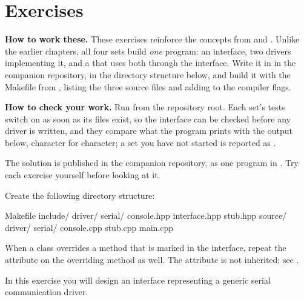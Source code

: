 
\section{Exercises}
\label{c3:sec:exercises}\label{c3:app:c}

\begin{aside}
\textbf{How to work these.} These exercises reinforce the concepts from
 and . Unlike the earlier chapters, all four
sets build \emph{one} program: an interface, two drivers implementing it, and a  that
uses both through the interface. Write it in  in the companion
repository, in the directory structure below, and build it with the Makefile from
, listing the three source files and adding  to the compiler
flags.

\textbf{How to check your work.} Run  from the repository root. Each set's tests
switch on as soon as its files exist, so the interface can be checked before any driver is written,
and they compare what the program prints with the output below, character for character; a set you
have not started is reported as .

The solution is published in the companion repository, as one program in
. Try each exercise yourself before looking at it.
\end{aside}

Create the following directory structure:

\begin{console}
Makefile
include/
    driver/
        serial/
            console.hpp
            interface.hpp
            stub.hpp
source/
    driver/
        serial/
            console.cpp
            stub.cpp
    main.cpp
\end{console}

\note When a class overrides a method that is marked \code{[[nodiscard]]} in the interface, repeat
the attribute on the overriding method as well. The attribute is not inherited; see
.

\label{c3:set:1}

\label{c3:ex:1.1}
In this exercise you will design an interface  representing a
generic serial communication driver.

